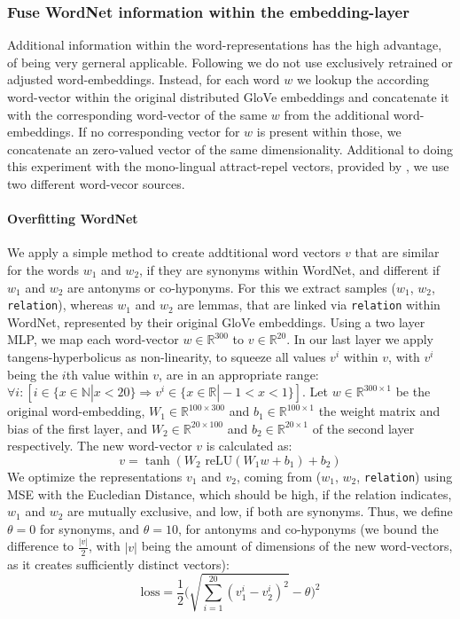 \subsubsection{Fuse WordNet information within the embedding-layer}
Additional information within the word-representations has the high advantage, of being very gerneral applicable. Following \cite{ruckle2018concatenated} we do not use exclusively retrained or adjusted word-embeddings. Instead, for each word $w$ we lookup the according word-vector within the original distributed GloVe embeddings and concatenate it with the corresponding word-vector of the same $w$ from the additional word-embeddings. If no corresponding vector for $w$ is present within those, we concatenate an zero-valued vector of the same dimensionality. Additional to doing this experiment with the mono-lingual attract-repel vectors, provided by \cite{ruckle2018concatenated}, we use two different word-vecor sources.

\paragraph*{Overfitting WordNet}
We apply a simple method to create addtitional word vectors $v$ that are similar for the words $w_1$ and $w_2$, if they are synonyms within WordNet, and different if $w_1$ and $w_2$ are antonyms or co-hyponyms. For this we extract samples ($w_1$, $w_2$, \texttt{relation}), whereas $w_1$ and $w_2$ are lemmas, that are linked via \texttt{relation} within WordNet, represented by their original GloVe embeddings. Using a two layer \ac{MLP}, we map each word-vector $w \in \mathbb{R}^{300}$ to $v \in \mathbb{R}^{20}$. In our last layer we apply tangens-hyperbolicus as non-linearity, to squeeze all values $v^i$ within $v$, with $v^i$ being the $i$th value within $v$, are in an appropriate range:  $ \forall i: [i \in \{x \in \mathbb{N} | x < 20\} \Rightarrow v^i \in \{x \in \mathbb{R} | -1 < x < 1\}]$. Let $w \in \mathbb{R}^{300 \times 1}$ be the original word-embedding, $W_1 \in \mathbb{R}^{100 \times 300}$ and $b_1 \in \mathbb{R}^{100 \times 1}$ the weight matrix and bias of the first layer, and $W_2 \in \mathbb{R}^{20 \times 100}$ and $b_2 \in \mathbb{R}^{20 \times 1}$ of the second layer respectively. The new word-vector $v$ is calculated as:
\begin{equation}
v = \tanh(W_2 \text{ reLU}(W_1w + b_1) + b_2)
\end{equation}
We optimize the representations $v_1$ and $v_2$, coming from ($w_1$, $w_2$, \texttt{relation}) using \ac{MSE} with the Eucledian Distance, which should be high, if the relation indicates, $w_1$ and $w_2$ are mutually exclusive, and low, if both are synonyms. Thus, we define $\theta=0$ for synonyms, and $\theta =10$, for antonyms and co-hyponyms (we bound the difference to $\frac{|v|}{2}$, with $|v|$ being the amount of dimensions of the new word-vectors, as it creates sufficiently distinct vectors):
\begin{equation}
\text{loss} = \frac{1}{2}\Bigg( \sqrt{\sum^{20}_{i=1}(v^i_1 - v^i_2)^2} - \theta\Bigg)^2
\end{equation}
